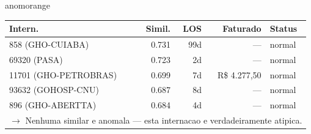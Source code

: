 \documentclass[a4paper,10pt]{article}
\begin{document}
\begin{anomalycard}[Internacao 113795 | GHO-BRADESCO | ALTO (z=3.57)]{anomorange}
\begin{tabular}{l r r r l}\toprule\textbf{Intern.} & \textbf{Simil.} & \textbf{LOS} & \textbf{Faturado} & \textbf{Status} \\\midrule
858 (GHO-CUIABA) & 0.731 & 99d & --- & \textcolor{jcubeblue}{normal} \\
69320 (PASA) & 0.723 & 2d & --- & \textcolor{jcubeblue}{normal} \\
11701 (GHO-PETROBRAS) & 0.699 & 7d & R\$ 4.277,50 & \textcolor{jcubeblue}{normal} \\
93632 (GOHOSP-CNU) & 0.687 & 8d & --- & \textcolor{jcubeblue}{normal} \\
896 (GHO-ABERTTA) & 0.684 & 4d & --- & \textcolor{jcubeblue}{normal} \\
\multicolumn{5}{l}{\textcolor{jcubeblue}{\small $\rightarrow$ Nenhuma similar e anomala --- esta internacao e verdadeiramente atipica.}} \\
\bottomrule\end{tabular}


\end{anomalycard}

\newpage
\end{document}
